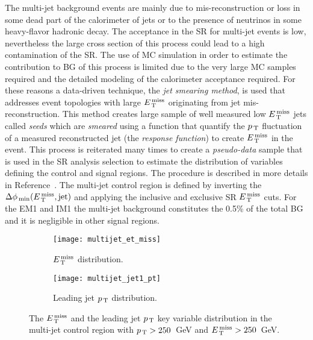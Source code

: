 The multi-jet background events are mainly due to mis-reconstruction or loss in
some dead part of the calorimeter of jets or to the presence of neutrinos in
some heavy-flavor hadronic decay. The acceptance in the SR for multi-jet events
is low, nevertheless the large cross section of this process could lead to a
high contamination of the SR\@. The use of MC simulation in order to estimate
the contribution to BG of this process is limited due to the very large MC
samples required and the detailed modeling of the calorimeter acceptance
required. For these reasons a data-driven technique, the \emph{jet smearing
  method}, is used that addresses event topologies with large $E_\mathrm{\, T}^\mathrm{\, miss}$ originating
from jet mis-reconstruction. This method creates large sample of well measured
low $E_\mathrm{\, T}^\mathrm{\, miss}$ jets called \emph{seeds} which are \emph{smeared} using a function
that quantify the $p_\mathrm{\, T}$ fluctuation of a measured reconstructed jet (the
\emph{response function}) to create $E_\mathrm{\, T}^\mathrm{\, miss}$ in the event. This process is
reiterated many times to create a \emph{pseudo-data} sample that is used in the
SR analysis selection to estimate the distribution of variables defining the
control and signal regions. The procedure is described in more details in
Reference~\cite{JetSmearing}. The multi-jet control region is defined by
inverting the $\Delta \phi_\mathrm{\, min} (E_\mathrm{\, T}^\mathrm{\, miss}, \mathrm{jet})$ and applying
the inclusive and exclusive SR $E_\mathrm{\, T}^\mathrm{\, miss}$ cuts. For the EM1 and IM1 the multi-jet
background constitutes the 0.5\% of the total BG and it is negligible in other
signal regions.

\begin{figure}[!h]
  \centering
  \begin{subfigure}[t]{.48\linewidth}
    \texttt{[image: multijet\_et\_miss]}
    \caption{$E_\mathrm{\, T}^\mathrm{\, miss}$ distribution.}
    \label{fig:dimuon_cr_et_miss_pre_fit}
  \end{subfigure}
  \begin{subfigure}[t]{.48\linewidth}
    \texttt{[image: multijet\_jet1\_pt]}
    \caption{Leading jet $p_\mathrm{\, T}$ distribution.}
    \label{fig:dimuon_cr_jet1_pt_pre_fit}
  \end{subfigure}
  \caption{The $E_\mathrm{\, T}^\mathrm{\, miss}$ and the leading jet $p_\mathrm{\, T}$ key variable distribution in the
    multi-jet control region with $p_\mathrm{\, T} > 250$~GeV and $E_\mathrm{\, T}^\mathrm{\, miss} > 250$~GeV.}
  \label{fig:multijet_distributions}
\end{figure}
